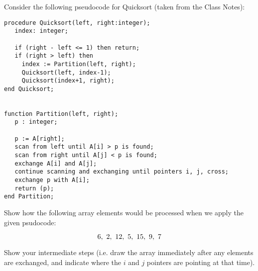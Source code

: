 Consider the following pseudocode for Quicksort (taken from the Class Notes):
\begin{verbatim}
procedure Quicksort(left, right:integer);
   index: integer;

   if (right - left <= 1) then return;
   if (right > left) then
     index := Partition(left, right);
     Quicksort(left, index-1);
     Quicksort(index+1, right);
end Quicksort;


function Partition(left, right);
   p : integer;

   p := A[right];
   scan from left until A[i] > p is found;
   scan from right until A[j] < p is found;
   exchange A[i] and A[j];
   continue scanning and exchanging until pointers i, j, cross;
   exchange p with A[i];
   return (p);
end Partition;
\end{verbatim}

Show how the following array elements would be processed when we apply the
given psudocode:

$$6,\hbox{      } 2,\hbox{      } 12,\hbox{      } 5,\hbox{      } 15,\hbox{      } 9,\hbox{      } 7$$

Show your intermediate steps (i.e. draw the array immediately after any elements
are exchanged, and indicate where the $i$ and $j$ pointers are pointing at that
time).
